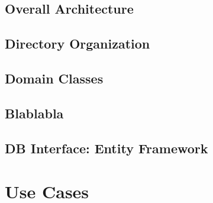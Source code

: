 \documentclass[conference]{IEEEtran}
\begin{document}
        \subsection{Overall Architecture}

        \subsection{Directory Organization}

        \subsection{Domain Classes}
        \subsection{Blablabla}
        \subsection{DB Interface: Entity Framework}
            
    \section{Use Cases}
\end{document}
